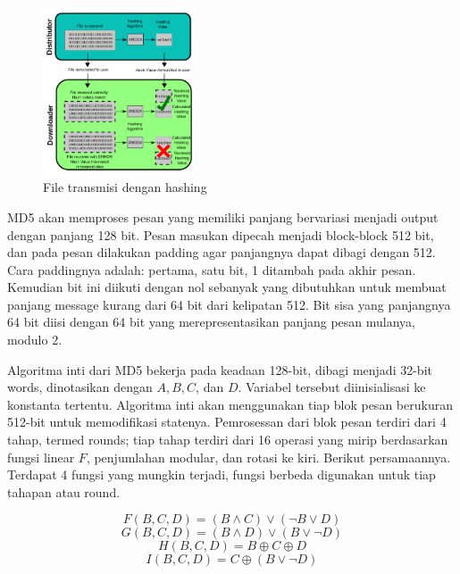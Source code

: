 \begin{figure} [ht]
  \centering
  \includegraphics[width=0.4\textwidth]{gambar/hashing-file-transmission.png}

  \caption{File transmisi dengan hashing}
  \label{fig:hashingfiletransmission}
\end{figure}

MD5 akan memproses pesan yang memiliki panjang bervariasi menjadi output dengan panjang 128 bit. Pesan masukan dipecah menjadi block-block 512 bit, dan pada pesan dilakukan padding agar panjangnya dapat dibagi dengan 512. Cara paddingnya adalah: pertama, satu bit, 1 ditambah pada akhir pesan. Kemudian bit ini diikuti dengan nol sebanyak yang dibutuhkan untuk membuat panjang message kurang dari 64 bit dari kelipatan 512. Bit sisa yang panjangnya 64 bit diisi dengan 64 bit yang merepresentasikan panjang pesan mulanya, modulo 2.

Algoritma inti dari MD5 bekerja pada keadaan 128-bit, dibagi menjadi 32-bit words, dinotasikan dengan \(A, B, C\), dan \(D\). Variabel tersebut diinisialisasi ke konstanta tertentu. Algoritma inti akan menggunakan tiap blok pesan berukuran 512-bit untuk memodifikasi statenya. Pemrosessan dari blok pesan terdiri dari 4 tahap, termed rounds; tiap tahap terdiri dari 16 operasi yang mirip berdasarkan fungsi linear \(F\), penjumlahan modular, dan rotasi ke kiri. Berikut persamaannya. Terdapat 4 fungsi yang mungkin terjadi, fungsi berbeda digunakan untuk tiap tahapan atau round.

\begin{equation}
\label{eq:md5sum}
F(B,C,D) = (B \land C) \lor (\neg B \lor D)
\end{equation}
\begin{equation}
G(B,C,D) = (B \land D) \lor (B \lor \neg D)
\end{equation}
\begin{equation}
H(B,C,D) = B \oplus C \oplus D
\end{equation}
\begin{equation}
I(B,C,D) = C \oplus (B \lor \neg D)
\end{equation}

